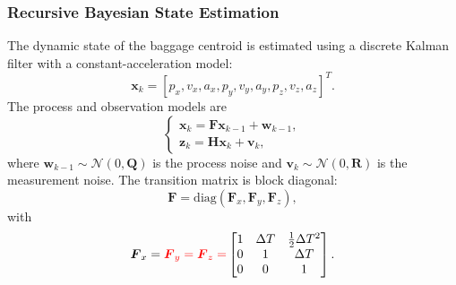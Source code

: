 \subsubsection{Recursive Bayesian State Estimation}
The dynamic state of the baggage centroid is estimated using a discrete Kalman filter with a constant-acceleration model:
\begin{equation}
\boldsymbol{x}_{k}=[p_x,v_x,a_x,p_y,v_y,a_y,p_z,v_z,a_z]^T.
\end{equation}
The process and observation models are
\begin{equation}
\begin{cases}
\boldsymbol{x}_{k}=\boldsymbol{F}\boldsymbol{x}_{k-1}+\boldsymbol{w}_{k-1},\\
\boldsymbol{z}_{k}=\boldsymbol{H}\boldsymbol{x}_{k}+\boldsymbol{v}_{k},
\end{cases}
\label{eq:state}
\end{equation}
where $\boldsymbol{w}_{k-1}\sim\mathcal{N}(0,\boldsymbol{Q})$ is the process noise and $\boldsymbol{v}_{k}\sim\mathcal{N}(0,\boldsymbol{R})$ is the measurement noise.  The transition matrix is block diagonal:
\begin{equation}
\boldsymbol{F}=\mathrm{diag}(\boldsymbol{F}_{x},\boldsymbol{F}_{y},\boldsymbol{F}_{z}),
\end{equation}
with
\begin{equation}
\boldsymbol{F}_{x}={\color{red}\boldsymbol{F}_{y}=\boldsymbol{F}_{z}=}\begin{bmatrix}
1 & \Delta T & \frac{1}{2}\Delta T^{2}\\
0 & 1 & \Delta T\\
0 & 0 & 1
\end{bmatrix}.
\label{eq:fx}
\end{equation}

